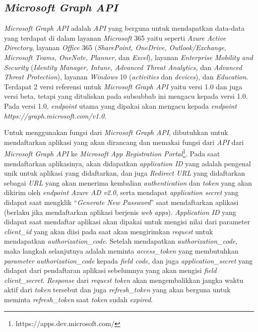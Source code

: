 \subsection{\textit{Microsoft Graph API}}
\label{sec:microsoftgraph}
\textit{Microsoft Graph API} adalah \textit{API} yang berguna untuk mendapatkan data-data yang terdapat di dalam layanan \textit{Microsoft} 365 yaitu seperti \textit{Azure Active Directory}, layanan \textit{Office} 365 (\textit{SharePoint, OneDrive, Outlook/Exchange, Microsoft Teams, OneNote, Planner,} dan \textit{Excel}), layanan \textit{Enterprise Mobility and Security} (\textit{Identity Manager, Intune, Advanced Threat Analytics,} dan \textit{Advanced Threat Protection}), layanan \textit{Windows} 10 (\textit{activities} dan \textit{devices}), dan \textit{Education}. Terdapat 2 versi referensi untuk \textit{Microsoft Graph API} yaitu versi 1.0 dan juga versi beta, tetapi yang dituliskan pada subsubbab ini mengacu kepada versi 1.0. \cite{microsoft} Pada versi 1.0, \textit{endpoint} utama yang dipakai akan mengacu kepada \textit{endpoint} \textit{https://graph.microsoft.com/v1.0}. 

Untuk menggunakan fungsi dari \textit{Microsoft Graph API}, dibutuhkan untuk mendaftarkan aplikasi yang akan dirancang dan memakai fungsi dari \textit{API} dari \textit{Microsoft Graph API} ke \textit{Microsoft App Registration Portal}\footnote{https://apps.dev.microsoft.com/}. Pada saat mendaftarkan aplikasinya, akan didapatkan \textit{application ID} yang adalah pengenal unik untuk aplikasi yang didaftarkan, dan juga \textit{Redirect URL} yang didaftarkan sebagai \textit{URL} yang akan menerima kembalian \textit{authentication} dan \textit{token} yang akan dikirim oleh \textit{endpoint Azure AD v2.0}, serta mendapat \textit{application secret} yang didapat saat mengklik ``\textit{Generate New Password}'' saat mendaftarkan aplikasi (berlaku jika mendaftarkan aplikasi berjenis \textit{web apps}). \textit{Application ID} yang didapat saat mendaftar aplikasi akan dipakai untuk mengisi nilai dari parameter \textit{client\_id} yang akan diisi pada saat akan mengirimkan \textit{request} untuk mendapatkan \textit{authorization\_code}. Setelah mendapatkan \textit{authorization\_code}, maka langkah selanjutnya adalah meminta \textit{access\_token} yang membutuhkan \textit{parameter} \textit{authorization\_code} kepada \textit{field code}, dan juga \textit{application\_secret} yang didapat dari pendaftaran aplikasi sebelumnya yang akan mengisi \textit{field client\_secret}. \textit{Response} dari \textit{request token} akan mengembalikkan jangka waktu aktif dari \textit{token} tersebut dan juga \textit{refresh\_token} yang akan berguna untuk meminta \textit{refresh\_token} saat \textit{token} sudah \textit{expired}.

